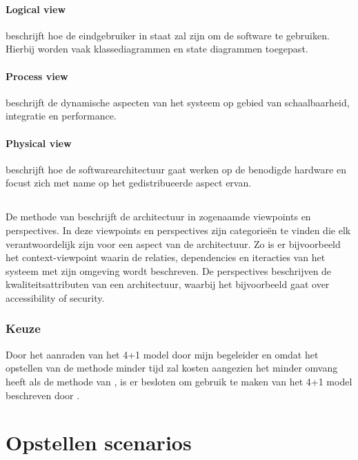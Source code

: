 \paragraph{Logical view} beschrijft hoe de eindgebruiker in staat zal zijn om de software te gebruiken. Hierbij worden vaak klassediagrammen en state diagrammen toegepast.
\paragraph{Process view} beschrijft de dynamische aspecten van het systeem op gebied van schaalbaarheid, integratie en performance.
\paragraph{Physical view} beschrijft hoe de softwarearchitectuur gaat werken op de benodigde hardware en focust zich met name op het gedistribueerde aspect ervan.

\subsection{\citeauthor{rozanski2012software}}

De methode van \cite{rozanski2012software} beschrijft de architectuur in zogenaamde viewpoints en perspectives. In deze viewpoints en perspectives zijn categorieën te vinden die elk verantwoordelijk zijn voor een aspect van de architectuur. Zo is er bijvoorbeeld het context-viewpoint waarin de relaties, dependencies en iteracties van het systeem met zijn omgeving wordt beschreven. De perspectives beschrijven de kwaliteitsattributen van een architectuur, waarbij het bijvoorbeeld gaat over accessibility of security.

\subsubsection{Keuze}

Door het aanraden van het 4+1 model door mijn begeleider en omdat het opstellen van de methode minder tijd zal kosten aangezien het minder omvang heeft als de methode van \cite{rozanski2012software}, is er besloten om gebruik te maken van het 4+1 model beschreven door \cite{kruchten19954+}.

\clearpage

\section{Opstellen scenarios}

